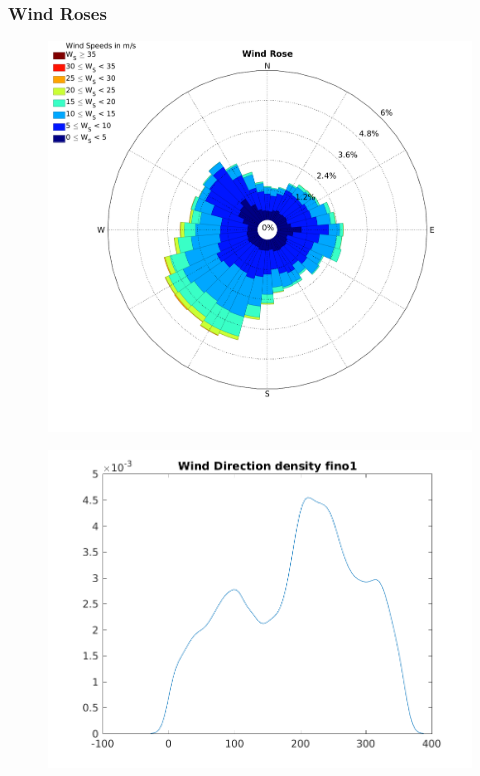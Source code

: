 \documentclass[12pt,t]{beamer}
\begin{document}
\begin{frame}
	\frametitle{Wind Roses}
\begin{figure}[htbp]
	\begin{center}
		\begin{minipage}[t]{0.4\linewidth}
			\centering
			\includegraphics[width=\linewidth]{../../figures/WindRose_Fino1.png}

			\label{label 1}
		\end{minipage}
		\qquad
		\pause
		\begin{minipage}[t]{0.5\linewidth}
			\centering
			\includegraphics[width=\linewidth]{../../figures/Validation_WindRose_Fino1.png}
			\label{label 2}
		\end{minipage}
	\end{center}
\end{figure}
\end{frame}
\end{document}
